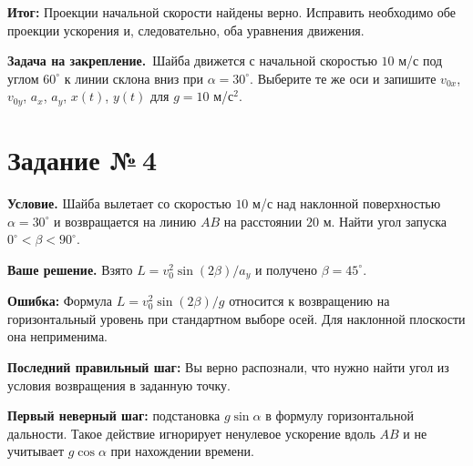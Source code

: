 \documentclass[a4paper,12pt]{article}
\newcommand{\err}[1]{\textcolor{error}{\textbf{Ошибка:} #1}}
\newcommand{\result}[1]{\textcolor{darkaccent}{\textbf{Итог:} #1}}
\newcommand{\practice}{\medskip\textbf{Задача на закрепление.}~}
\newcommand{\task}[1]{\clearpage\phantomsection\label{task:#1}\section*{Задание №\,#1}}
\begin{document}
\result{Проекции начальной скорости найдены верно. Исправить необходимо обе проекции ускорения и, следовательно, оба уравнения движения.}

\practice Шайба движется с начальной скоростью $10$ м/с под углом $60^\circ$ к линии склона вниз при $\alpha=30^\circ$. Выберите те же оси и запишите $v_{0x}$, $v_{0y}$, $a_x$, $a_y$, $x(t)$, $y(t)$ для $g=10$ м/с$^2$.


\task{4}
\textbf{Условие.} Шайба вылетает со скоростью $10$ м/с над наклонной поверхностью $\alpha=30^\circ$ и возвращается на линию $AB$ на расстоянии $20$ м. Найти угол запуска $0^\circ<\beta<90^\circ$.

\textbf{Ваше решение.} Взято $L=v_0^2\sin(2\beta)/a_y$ и получено $\beta=45^\circ$.

\err{Формула $L=v_0^2\sin(2\beta)/g$ относится к возвращению на горизонтальный уровень при стандартном выборе осей. Для наклонной плоскости она неприменима.}

\textbf{Последний правильный шаг:} Вы верно распознали, что нужно найти угол из условия возвращения в заданную точку.

\textbf{Первый неверный шаг:} подстановка $g\sin\alpha$ в формулу горизонтальной дальности. Такое действие игнорирует ненулевое ускорение вдоль $AB$ и не учитывает $g\cos\alpha$ при нахождении времени.
\end{document}
